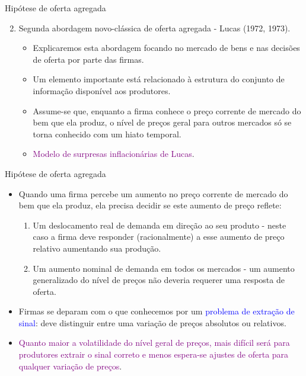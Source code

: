\documentclass[10pt]{beamer}
\begin{document}
\begin{frame}{Hipótese de oferta agregada}
    \begin{enumerate}
        \setcounter{enumi}{1}
        \item Segunda abordagem novo-clássica de oferta agregada - Lucas (1972, 1973).
        \bigskip
        \begin{itemize}
            \item Explicaremos esta abordagem focando no mercado de bens e nas decisões de oferta por parte das firmas.
            \bigskip
            \item Um elemento importante está relacionado à estrutura do conjunto de informação disponível aos produtores.
            \bigskip
            \item Assume-se que, enquanto a firma conhece o preço corrente de mercado do bem que ela produz, o nível de preços geral para outros mercados só se torna conhecido com um hiato temporal.
            \bigskip
            \item \textcolor{purple}{Modelo de surpresas inflacionárias de Lucas}.
        \end{itemize}
    \end{enumerate}
\end{frame}

\begin{frame}{Hipótese de oferta agregada}
    \begin{itemize}
        \item Quando uma firma percebe um aumento no preço corrente de mercado do bem que ela produz, ela precisa decidir se este aumento de preço reflete:
        \bigskip
        \begin{enumerate}
            \item Um deslocamento real de demanda em direção ao seu produto - neste caso a firma deve responder (racionalmente) a esse aumento de preço relativo aumentando sua produção.
            \bigskip
            \item Um aumento nominal de demanda em todos os mercados - um aumento generalizado do nível de preços não deveria requerer uma resposta de oferta.
        \end{enumerate}
        \bigskip
        \item Firmas se deparam com o que conhecemos por um \textcolor{blue}{problema de extração de sinal}: deve distinguir entre uma variação de preços absolutos ou relativos.
        \bigskip
        \item \textcolor{purple}{Quanto maior a volatilidade do nível geral de preços, mais difícil será para produtores extrair o sinal correto e menos espera-se ajustes de oferta para qualquer variação de preços}.
    \end{itemize}
\end{frame}
\end{document}
